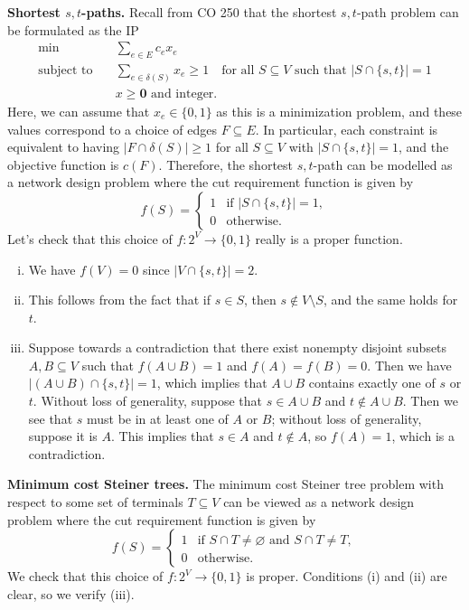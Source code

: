 {\bf Shortest $s,t$-paths.} Recall from CO 250 that the shortest $s,t$-path 
problem can be formulated as the IP 
\begin{align*}
    \min\quad & \sum_{e\in E} c_e x_e \\ 
    \text{subject to}\quad & \sum_{e\in \delta(S)} x_e \geq 1 
    \quad \text{for all $S \subseteq V$ such that $|S \cap \{s, t\}| = 1$} \\
    & x \geq \mathbf 0 \text{ and integer.}
\end{align*}
Here, we can assume that $x_e \in \{0, 1\}$ as this is a minimization problem,
and these values correspond to a choice of edges 
$F \subseteq E$. In particular, each constraint is equivalent to having 
$|F \cap \delta(S)| \geq 1$ for all $S \subseteq V$ with $|S \cap \{s, t\}| = 1$,
and the objective function is $c(F)$. Therefore, the shortest $s,t$-path can be 
modelled as a network design problem where the cut requirement function 
is given by 
\[ f(S) = \begin{cases}
    1 & \text{if } |S \cap \{s, t\}| = 1, \\ 
    0 & \text{otherwise.}
\end{cases} \] 
Let's check that this choice of $f : 2^V \to \{0, 1\}$ really is a proper function.
\begin{enumerate}[(i)]
    \item We have $f(V) = 0$ since $|V \cap \{s, t\}| = 2$. 
    \item This follows from the fact that if $s \in S$, then $s \notin V \setminus S$,
    and the same holds for $t$.
    \item Suppose towards a contradiction that there exist nonempty disjoint
    subsets $A, B \subseteq V$ such that $f(A \cup B) = 1$ and $f(A) = f(B) = 0$. 
    Then we have $|(A \cup B) \cap \{s, t\}| = 1$, which implies that 
    $A \cup B$ contains exactly one of $s$ or $t$. Without loss of generality, 
    suppose that $s \in A \cup B$ and $t \notin A \cup B$. Then we see that 
    $s$ must be in at least one of $A$ or $B$; without loss of generality, 
    suppose it is $A$. This implies that $s \in A$ and $t \notin A$, so 
    $f(A) = 1$, which is a contradiction.
\end{enumerate}

{\bf Minimum cost Steiner trees.} The minimum cost Steiner tree problem
with respect to some set of terminals $T \subseteq V$ 
can be viewed as a network design problem where the cut requirement 
function is given by 
\[ f(S) = \begin{cases}
    1 & \text{if $S \cap T \neq \varnothing$ and $S \cap T \neq T$}, \\
    0 & \text{otherwise.}
\end{cases} \] 
We check that this choice of $f : 2^V \to \{0, 1\}$ is proper. 
Conditions (i) and (ii) are clear, so we verify (iii). 

